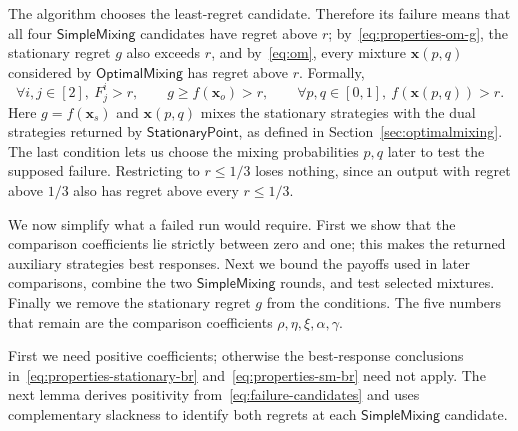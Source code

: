 \documentclass[11pt]{article}
\theoremstyle{remark}
\theoremstyle{plain}
\newcommand{\sm}{\mathsf{SimpleMixing}}
\newcommand{\om}{\mathsf{OptimalMixing}}
\newcommand{\spoint}{\mathsf{StationaryPoint}}
\begin{document}
The algorithm chooses the least-regret candidate. Therefore its
failure means that all four $\sm$ candidates have regret above $r$;
by~\eqref{eq:properties-om-g}, the stationary regret $g$ also
exceeds $r$, and by~\eqref{eq:om}, every mixture
$\boldsymbol x(p,q)$ considered by $\om$ has regret above $r$. Formally,
\begin{equation}
 \forall i,j\in[2],\ F_j^i>r,\qquad
 g\ge f(\boldsymbol x_o)>r,\qquad
 \forall p,q\in[0,1],\ f(\boldsymbol x(p,q))>r.
 \label{eq:failure-candidates}
\end{equation}
Here $g=f(\boldsymbol x_s)$ and $\boldsymbol x(p,q)$ mixes the
stationary strategies with the dual strategies returned by
$\spoint$, as defined in Section~\ref{sec:optimalmixing}.
The last condition lets us choose the mixing probabilities $p,q$
later to test the supposed failure. Restricting to $r\le1/3$ loses
nothing, since an output with regret above $1/3$ also has regret
above every $r\le1/3$.

We now simplify what a failed run would require. First we show
that the comparison coefficients lie strictly between zero and one;
this makes the returned auxiliary strategies best responses. Next
we bound the payoffs used in later comparisons, combine the two
$\sm$ rounds, and test selected mixtures. Finally we remove the
stationary regret $g$ from the conditions. The five numbers that
remain are the comparison coefficients $\rho,\eta,\xi,\alpha,\gamma$.

First we need positive coefficients; otherwise the best-response
conclusions in~\eqref{eq:properties-stationary-br}
and~\eqref{eq:properties-sm-br} need not apply. The next lemma
derives positivity from~\eqref{eq:failure-candidates} and uses
complementary slackness to identify both regrets at each $\sm$
candidate.
\end{document}

